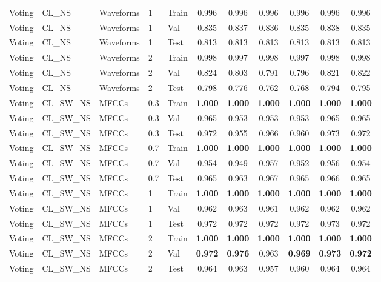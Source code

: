 \begin{landscape}
\begin{longtable}{|l|l|l|l|l|c|c|c|c|c|c|}
Voting & CL\_NS & Waveforms & 1 & Train & 0.996 & 0.996 & 0.996 & 0.996 & 0.996 & 0.996 \\
Voting & CL\_NS & Waveforms & 1 & Val & 0.835 & 0.837 & 0.836 & 0.835 & 0.838 & 0.835 \\
Voting & CL\_NS & Waveforms & 1 & Test & 0.813 & 0.813 & 0.813 & 0.813 & 0.813 & 0.813 \\
Voting & CL\_NS & Waveforms & 2 & Train & 0.998 & 0.997 & 0.998 & 0.997 & 0.998 & 0.998 \\
Voting & CL\_NS & Waveforms & 2 & Val & 0.824 & 0.803 & 0.791 & 0.796 & 0.821 & 0.822 \\
Voting & CL\_NS & Waveforms & 2 & Test & 0.798 & 0.776 & 0.762 & 0.768 & 0.794 & 0.795 \\
Voting & CL\_SW\_NS & MFCCs & 0.3 & Train & \textbf{1.000} & \textbf{1.000} & \textbf{1.000} & \textbf{1.000} & \textbf{1.000} & \textbf{1.000} \\
Voting & CL\_SW\_NS & MFCCs & 0.3 & Val & 0.965 & 0.953 & 0.953 & 0.953 & 0.965 & 0.965 \\
Voting & CL\_SW\_NS & MFCCs & 0.3 & Test & 0.972 & 0.955 & 0.966 & 0.960 & 0.973 & 0.972 \\
Voting & CL\_SW\_NS & MFCCs & 0.7 & Train & \textbf{1.000} & \textbf{1.000} & \textbf{1.000} & \textbf{1.000} & \textbf{1.000} & \textbf{1.000} \\
Voting & CL\_SW\_NS & MFCCs & 0.7 & Val & 0.954 & 0.949 & 0.957 & 0.952 & 0.956 & 0.954 \\
Voting & CL\_SW\_NS & MFCCs & 0.7 & Test & 0.965 & 0.963 & 0.967 & 0.965 & 0.966 & 0.965 \\
Voting & CL\_SW\_NS & MFCCs & 1 & Train & \textbf{1.000} & \textbf{1.000} & \textbf{1.000} & \textbf{1.000} & \textbf{1.000} & \textbf{1.000} \\
Voting & CL\_SW\_NS & MFCCs & 1 & Val & 0.962 & 0.963 & 0.961 & 0.962 & 0.962 & 0.962 \\
Voting & CL\_SW\_NS & MFCCs & 1 & Test & 0.972 & 0.972 & 0.972 & 0.972 & 0.973 & 0.972 \\
Voting & CL\_SW\_NS & MFCCs & 2 & Train & \textbf{1.000} & \textbf{1.000} & \textbf{1.000} & \textbf{1.000} & \textbf{1.000} & \textbf{1.000} \\
Voting & CL\_SW\_NS & MFCCs & 2 & Val & \textbf{0.972} & \textbf{0.976} & 0.963 & \textbf{0.969} & \textbf{0.973} & \textbf{0.972} \\
Voting & CL\_SW\_NS & MFCCs & 2 & Test & 0.964 & 0.963 & 0.957 & 0.960 & 0.964 & 0.964 \\

\end{longtable}
\end{landscape}

